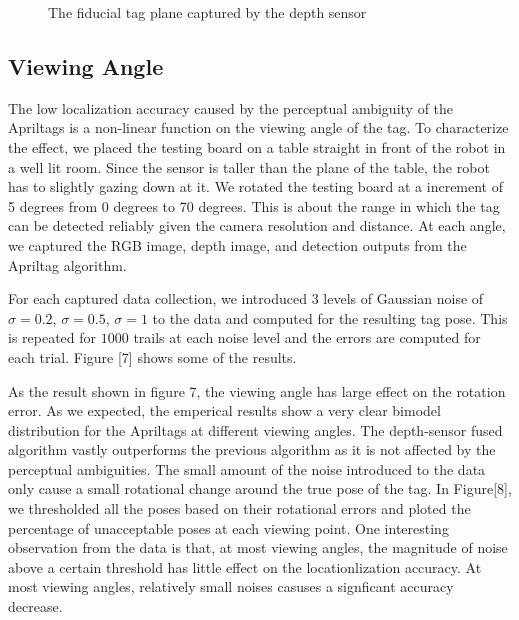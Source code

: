 \begin{figure}
\caption{The fiducial tag plane captured by the depth sensor}
\label{fig:calib}
\end{figure}

\subsection{Viewing Angle}
The low localization accuracy caused by the perceptual ambiguity of the Apriltags is a non-linear function on the viewing angle of the tag. To characterize the effect, we placed the testing board on a table straight in front of the robot in a well lit room. Since the sensor is taller than the plane of the table, the robot has to slightly gazing down at it.  We rotated the testing board at a increment of 5 degrees from 0 degrees to 70 degrees. This is about the range in which the tag can be detected reliably given the camera resolution and distance. At each angle, we captured the RGB image, depth image, and detection outputs from the Apriltag algorithm. 

For each captured data collection, we introduced 3 levels of Gaussian noise of $\sigma = 0.2$, $\sigma = 0.5$, $\sigma = 1$  to the data and computed for the resulting tag pose. This is repeated for $1000$ trails at each noise level and the errors are computed for each trial. Figure [7] shows some of the results. 

As the result shown in figure 7, the viewing angle has large effect on the rotation error. As we expected, the emperical results show a very clear bimodel distribution for the Apriltags at different viewing angles. The depth-sensor fused algorithm vastly outperforms the previous algorithm as it is not affected by the perceptual ambiguities. The small amount of the noise introduced to the data only cause a small rotational change around the true pose of the tag. In Figure[8], we thresholded all the poses based on their rotational errors and ploted the percentage of unacceptable poses at each viewing point. One interesting observation from the data is that, at most viewing angles, the magnitude of noise above a certain threshold has little effect on the locationlization accuracy. At most viewing angles, relatively small noises casuses a signficant accuracy decrease. 

